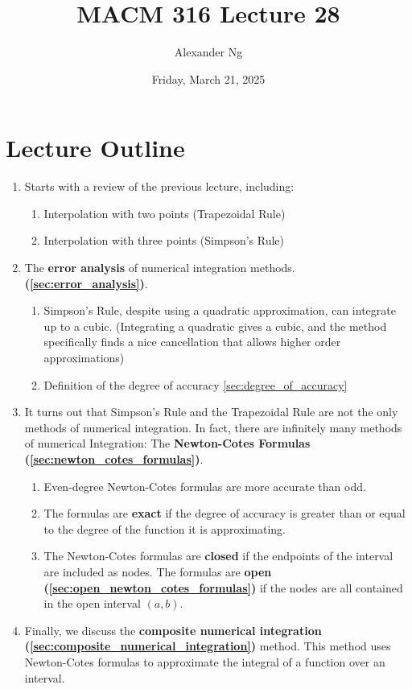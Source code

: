 \documentclass[12pt]{article}
\begin{document}
\title{MACM 316 Lecture 28}
\author{Alexander Ng}
\date{Friday, March 21, 2025}

\maketitle

\section*{Lecture Outline}

\begin{enumerate}
\item Starts with a review of the previous lecture, including:
  \begin{enumerate}[label=(\alph*)]
  \item Interpolation with two points (Trapezoidal Rule)
  \item Interpolation with three points (Simpson's Rule)
  \end{enumerate}
\item The \textbf{error analysis} of numerical integration methods.
  \textbf{(\ref{sec:error_analysis})}.
  \begin{enumerate}[label=(\alph*)]
  \item Simpson's Rule, despite using a quadratic approximation, can integrate
    up to a cubic. (Integrating a quadratic gives a cubic, and the method
    specifically finds a nice cancellation that allows higher order
    approximations)
  \item Definition of the degree of accuracy \ref{sec:degree_of_accuracy}
  \end{enumerate}
\item It turns out that Simpson's Rule and the Trapezoidal Rule are not the only
  methods of numerical integration. In fact, there are infinitely many methods
  of numerical Integration: The \textbf{Newton-Cotes Formulas
  (\ref{sec:newton_cotes_formulas})}.
  \begin{enumerate}[label=(\alph*)]
  \item Even-degree Newton-Cotes formulas are more accurate than odd.
  \item The formulas are \textbf{exact} if the degree of accuracy
    is greater than or equal to the degree of the function it is approximating.
  \item The Newton-Cotes formulas are \textbf{closed} if the endpoints of the
    interval are included as nodes. The formulas are \textbf{open
    (\ref{sec:open_newton_cotes_formulas})} if the nodes are all contained in
    the open interval $(a,b)$.
  \end{enumerate}
\item Finally, we discuss the \textbf{composite numerical integration
  (\ref{sec:composite_numerical_integration})} method. This method uses
  Newton-Cotes formulas to approximate the integral of a function over an
  interval.
\end{enumerate}
\end{document}
